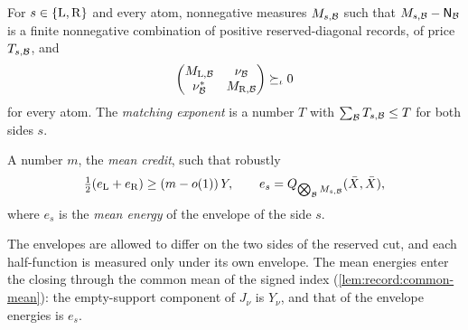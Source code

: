 \begin{definition}\label{def:cp6}
For $s\in\{{\rm L},{\rm R}\}$ and every atom, nonnegative measures
$M_{s,\mathcal B}$ such that $M_{s,\mathcal B}-\mathsf N_{\mathcal B}$ is a finite nonnegative
combination of positive reserved-diagonal records, of price $T_{s,\mathcal B}$,
and
\[
 \begin{pmatrix}M_{{\rm L},\mathcal B}&\nu_{\mathcal B}\\ \nu_{\mathcal B}^*&M_{{\rm R},\mathcal B}
 \end{pmatrix}\succeq_\iota0
\]
for every atom. The \emph{matching exponent} is a number $T$ with
$\sum_{\mathcal B}T_{s,\mathcal B}\le T$ for both sides $s$.
\end{definition}

\begin{definition}\label{def:cp7}
A number $m$, the \emph{mean credit}, such that robustly
\[
 \tfrac12(e_{\rm L}+e_{\rm R})\ge(m-o(1))\,Y,\qquad
 e_s=Q_{\bigotimes_{\mathcal B}M_{s,\mathcal B}}(\bar X,\bar X),
\]
where $e_s$ is the \emph{mean energy} of the envelope of the side $s$.
\end{definition}

The envelopes are allowed to differ on the two sides of the reserved cut,
and each half-function is measured only under its own envelope. The mean
energies enter the closing through the common mean of the signed index
(\cref{lem:record:common-mean}): the empty-support component of $J_\nu$ is
$Y_\nu$, and that of the envelope energies is $e_s$.

